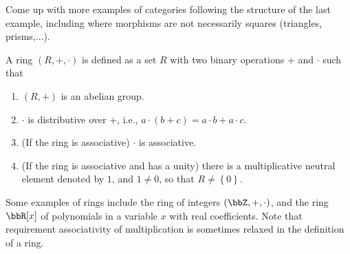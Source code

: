 \begin{xca}
    Come up with more examples of categories following the structure of
    the last example, including where morphisms are not necessarily squares
    (triangles, prisms,...).
\end{xca}
\begin{defn}[Rings]
    A ring $(R,+,\cdot)$ is defined as a set $R$ with two binary operations
    $+$ and $\cdot$ such that 
    \begin{enumerate}
        \item $(R,+)$ is an abelian group.
        \item $\cdot$ is distributive over $+$, i.e., $a\cdot(b+c)=a\cdot b+a\cdot c$.
        \item (If the ring is associative) $\cdot$ is associative.
        \item (If the ring is associative and has a unity) there is a multiplicative
        neutral element denoted by $1$, and $1\neq0$, so that $R\neq\left\{ 0\right\} $.
    \end{enumerate}
\end{defn}
Some examples of rings include the ring of integers $(\bbZ,+,\cdot)$,
and the ring $\bbR [x]$ of polynomials in a variable $x$ with
real coefficients. Note that requirement associativity of multiplication
is sometimes relaxed in the definition of a ring.

